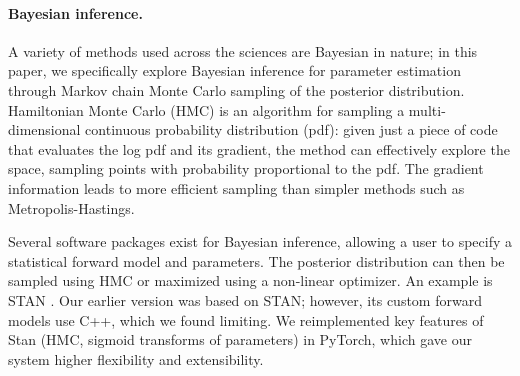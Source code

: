 \paragraph{Bayesian inference.} A variety of methods used across the sciences are Bayesian in nature; in this paper, we specifically explore Bayesian inference for parameter estimation through Markov chain Monte Carlo sampling of the posterior distribution. Hamiltonian Monte Carlo (HMC) \cite{Neal2012,Betancourt2017} is an algorithm for sampling a multi-dimensional continuous probability distribution (pdf): given just a piece of code that evaluates the log pdf and its gradient, the method can effectively explore the space, sampling points with probability proportional to the pdf. The gradient information leads to more efficient sampling than simpler methods such as Metropolis-Hastings.

Several software packages exist for Bayesian inference, allowing a user to specify a statistical forward model and parameters. The posterior distribution can then be sampled using HMC or maximized using a non-linear optimizer. An example is STAN \cite{Stan}. Our earlier version was based on STAN; however, its custom forward models use C++, which we found limiting. We reimplemented key features of Stan (HMC, sigmoid transforms of parameters) in PyTorch, which gave our system higher flexibility and extensibility.


